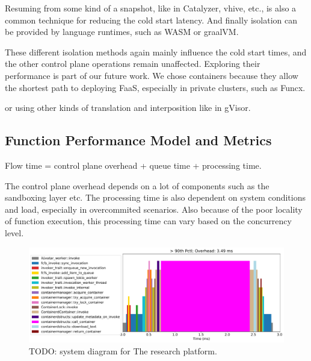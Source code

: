 Resuming from some kind of a snapshot, like in Catalyzer, vhive, etc., is also a common technique for reducing the cold start latency.
And finally isolation can be provided by language runtimes, such as WASM or graalVM.

These different isolation methods again mainly influence the cold start times, and the other control plane operations remain unaffected. Exploring their performance is part of our future work.
We chose containers because they allow the shortest path to deploying FaaS, especially in private clusters, such as Funcx. 


or using other kinds of translation and interposition like in gVisor.




\subsection{Function Performance Model and Metrics}
Flow time = control plane overhead + queue time + processing time.

The control plane overhead depends on a lot of components such as the sandboxing layer etc.
The processing time is also dependent on system conditions and load, especially in overcommited scenarios.
Also because of the poor locality of function execution, this processing time can vary based on the concurrency level.


\begin{figure} \includegraphics[width=\columnwidth]{../graphs/timelines/0-e1bc39-timeline.pdf}
    \caption{TODO: system diagram for The \sysname{} research platform.}
\end{figure}


